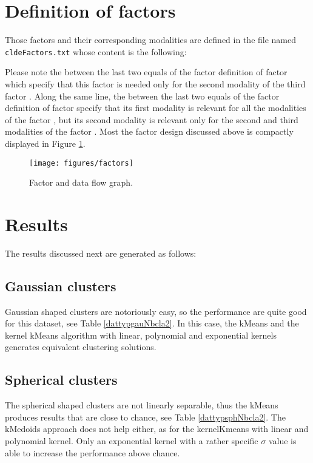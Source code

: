 \documentclass[12pt,a4paper,fleqn]{tufte-handout}
\begin{document}
\section{Definition of factors}

Those factors and their corresponding modalities are defined in the file named \texttt{cldeFactors.txt} whose content is the following:


Please note the  between the last two equals of the factor definition of factor  which specify that this factor is needed only for the second modality of the third factor . Along the same line, the  between the last two equals of the factor definition of factor   specify that its first modality is relevant for all the modalities of the factor , but its second modality is relevant only for the second and third modalities of the factor . Most the factor design discussed above is compactly displayed in Figure \ref{factorFlowGraph}.

\begin{figure}
\texttt{[image: figures/factors]}
\caption{Factor and data flow graph.}
\label{factorFlowGraph}
\end{figure}

\section{Results}

The results discussed next are generated as follows:


\subsection{Gaussian clusters}

Gaussian shaped clusters are notoriously easy, so the performance are quite good for this dataset, see Table \ref{dattypgauNbcla2}. In this case, the kMeans and the kernel kMeans algorithm with linear, polynomial and exponential kernels generates equivalent clustering solutions.

\subsection{Spherical clusters}

The spherical shaped clusters are not linearly separable, thus the kMeans produces results that are close to chance, see Table \ref{dattypsphNbcla2}. The kMedoids approach does not help either, as for the kernelKmeans with linear and polynomial kernel. Only an exponential kernel with a rather specific $\sigma$ value is able to increase the performance above chance.
\end{document}
